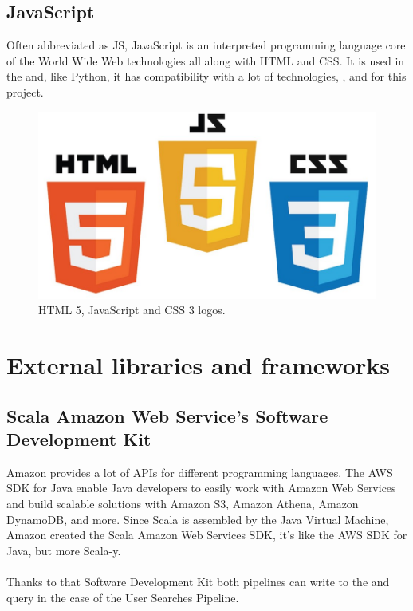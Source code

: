 \subsection*{JavaScript\cite{js}}

Often abbreviated as JS, JavaScript is an interpreted programming language core of the World Wide Web technologies all along with HTML\cite{html} and CSS\cite{css}. It is used in the  and, like Python, it has compatibility with a lot of technologies, ,  and  for this project.

\begin{figure}[H]
\includegraphics[scale=0.1]{resources/www-tech-logos.jpeg}
\caption{HTML 5, JavaScript and CSS 3 logos.}
\end{figure}

\section{External libraries and frameworks}

\subsection*{Scala Amazon Web Service's Software Development Kit\cite{scala_aws}} \label{scala_aws}

Amazon provides a lot of APIs for different programming languages. The AWS SDK for Java enable Java developers to easily work with Amazon Web Services and build scalable solutions with Amazon S3, Amazon Athena, Amazon DynamoDB, and more. Since Scala is assembled by the Java Virtual Machine, Amazon created the Scala Amazon Web Services SDK, it's like the AWS SDK for Java, but more Scala-y.
\\\\
Thanks to that Software Development Kit both pipelines can write to the  and query  in the case of the User Searches Pipeline.


